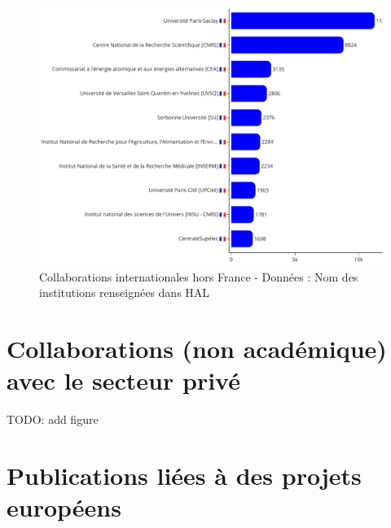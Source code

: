 \documentclass[french, 11pt]{dibiso/biso}
\begin{document}
\begin{figure}[!h]
  \includegraphics[width=\textwidth]{figures/collaboration_names.pdf}
  \caption{Collaborations internationales hors France - Données : Nom des institutions renseignées dans HAL}
  \label{fig_collab_names}
\end{figure}







\pagebreak

\section{Collaborations (non académique) avec le secteur privé}

TODO: add figure







\pagebreak

\section{Publications liées à des projets européens}
\end{document}
